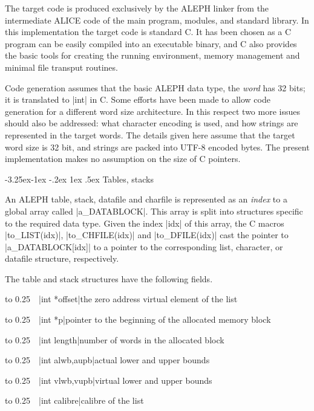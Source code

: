 \documentclass[titlepage]{article}
\makeatletter
\newcommand\A{\textsf{ALEPH}}
\newcommand\I{\textsf{ALICE}}
\newcommand\g[1]{\textsf{\color{blue!90!black}#1}}
\renewcommand\subsection{%
\@startsection{subsection}{2}{\z@}%
   {-3.25ex\@plus -1ex \@minus -.2ex}%
   {1ex \@plus .5ex}%
   {\normalfont\normalsize\bfseries}}
\makeatother
\begin{document}
The target code is produced exclusively by the \A{} linker from the
intermediate \I{} code of the main program, modules, and standard
library. In this implementation the target code is standard {\sf C}. It has
been chosen as a {\sf C} program can be easily compiled into an executable
binary, and {\sf C} also provides the basic tools for creating the running
environment, memory management and minimal file transput routines.

Code generation assumes that the basic \A{} data type, the \emph{word} has
32 bits; it is translated to \pp|int| in {\sf C}. Some efforts have been
made to allow code generation for a different word size architecture. In
this respect two more issues should also be addressed: what character
encoding is used, and how strings are represented in the target words. The
details given here assume that the target word size is 32 bit, and strings
are packed into UTF-8 encoded bytes. The present implementation makes no
assumption on the size of {\sf C} pointers.

\subsection{Tables, stacks}\label{subsec:tables-stacks}

An \A{} \g{table}, \g{stack}, \g{datafile} and \g{charfile} is represented
as an \emph{index} to a global array called \pp|a\_DATABLOCK|. This array is
split into structures specific to the required data type. Given the index
\pp|idx| of this array, the {\sf C} macros \pp|to\_LIST(idx)|,
\pp|to\_CHFILE(idx)| and \pp|to\_DFILE(idx)| cast the pointer to
\pp|a\_DATABLOCK[idx]| to a pointer to the corresponding list, character, or
datafile structure, respectively.

The \g{table} and \g{stack} structures have the following fields.
\def\HH{\noindent\hbox to 0.25\linewidth\bgroup~~}

\medskip

\HH\pp|int *offset|\HE the zero address virtual element of the list

\HH\pp|int *p|\HE  pointer to the beginning of the allocated memory block

\HH\pp|int length|\HE number of words in the allocated block

\HH\pp|int alwb,aupb|\HE actual lower and upper bounds

\HH\pp|int vlwb,vupb|\HE virtual lower and upper bounds

\HH\pp|int calibre|\HE  calibre of the list
\end{document}
